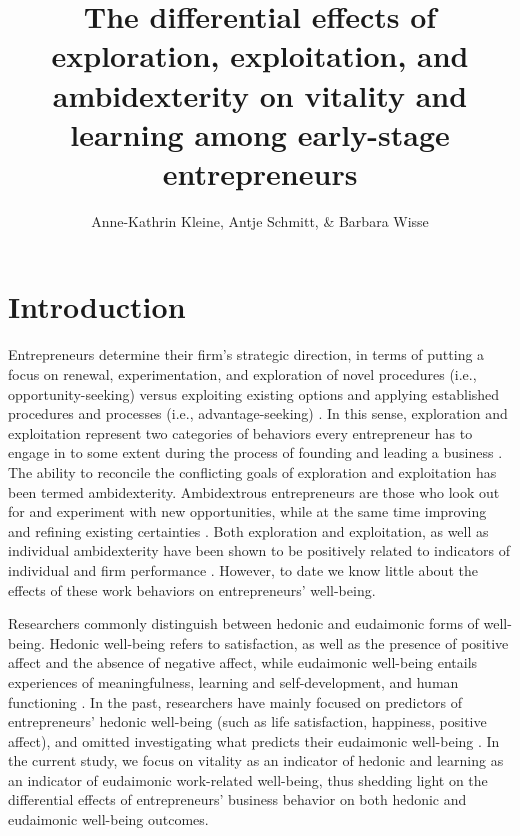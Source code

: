 \documentclass[man, 12pt, a4paper, noextraspace]{apa6}
\title{The differential effects of exploration, exploitation, and ambidexterity on vitality and learning among early-stage entrepreneurs}
\author{Anne-Kathrin Kleine, Antje Schmitt, \& Barbara Wisse}
\affiliation{University of Groningen}
\begin{document}
\maketitle

\section{Introduction}

Entrepreneurs determine their firm's strategic direction, in terms of putting a focus on renewal, experimentation, and exploration of novel procedures (i.e., opportunity-seeking) versus exploiting existing options and applying established procedures and processes (i.e., advantage-seeking) \parencite{Siren.2012, Ireland2009, Webb2010}. 
In this sense, exploration and exploitation represent two categories of behaviors every entrepreneur has to engage in to some extent during the process of founding and leading a business \parencite{Siren.2012, Uotila2009, DuaneIreland2007, Rosing.2017}.
The ability to reconcile the conflicting goals of exploration and exploitation has been termed ambidexterity. 
Ambidextrous entrepreneurs are those who look out for and experiment with new opportunities, while at the same time improving and refining existing certainties \parencite{Rosing.2017, Mom.2007}. 
Both exploration and exploitation, as well as individual ambidexterity have been shown to be positively related to indicators of individual and firm performance \parencite[e.g.,][]{Rosing.2017, Vicentini.2019, Mom.2018}.
However, to date we know little about the effects of these work behaviors on entrepreneurs' well-being. \par 

Researchers commonly distinguish between hedonic and eudaimonic forms of well-being. 
Hedonic well-being refers to satisfaction, as well as the presence of positive affect and the absence of negative aﬀect, while eudaimonic well-being entails experiences of meaningfulness, learning and self-development, and human functioning \parencite{Ryan2001}. 
In the past, researchers have mainly focused on predictors of entrepreneurs' hedonic well-being (such as life satisfaction, happiness, positive affect), and omitted investigating what predicts their eudaimonic well-being \parencite[see][]{Stephan2018, Ryff2019}. 
In the current study, we focus on vitality as an indicator of hedonic and learning as an indicator of eudaimonic work-related well-being, thus shedding light on the differential effects of entrepreneurs' business behavior on both hedonic and eudaimonic well-being outcomes. \par 
\end{document}
